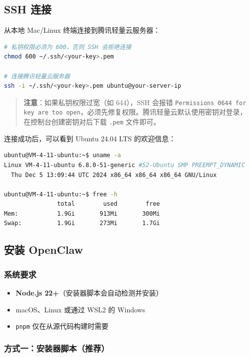 \subsection{SSH 连接}


从本地 Mac/Linux 终端连接到腾讯轻量云服务器：

\begin{lstlisting}[language=bash]
# 私钥权限必须为 600，否则 SSH 会拒绝连接
chmod 600 ~/.ssh/<your-key>.pem

# 连接腾讯轻量云服务器
ssh -i ~/.ssh/<your-key>.pem ubuntu@your-server-ip
\end{lstlisting}

\begin{quote}
\textbf{注意}：如果私钥权限过宽（如 644），SSH 会报错 \texttt{Permissions 0644 for key are too open}，必须先修复权限。腾讯轻量云默认使用密钥对登录，在控制台创建密钥对后下载 \texttt{.pem} 文件即可。
\end{quote}

连接成功后，可以看到 Ubuntu 24.04 LTS 的欢迎信息：

\begin{lstlisting}[language=bash]
ubuntu@VM-4-11-ubuntu:~$ uname -a
Linux VM-4-11-ubuntu 6.8.0-51-generic #52-Ubuntu SMP PREEMPT_DYNAMIC
  Thu Dec 5 13:09:44 UTC 2024 x86_64 x86_64 x86_64 GNU/Linux

ubuntu@VM-4-11-ubuntu:~$ free -h
               total        used        free
Mem:           1.9Gi       913Mi       300Mi
Swap:          1.9Gi       273Mi       1.7Gi
\end{lstlisting}

\subsection{安装 OpenClaw}

\subsubsection{系统要求}

\begin{itemize}
  \item \textbf{Node.js 22+}（安装器脚本会自动检测并安装）
  \item macOS、Linux 或通过 WSL2 的 Windows
  \item \texttt{pnpm} 仅在从源代码构建时需要
\end{itemize}

\subsubsection{方式一：安装器脚本（推荐）}


